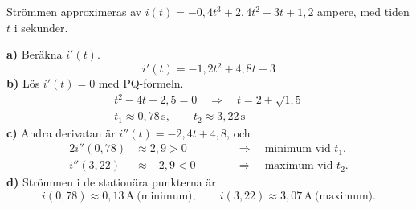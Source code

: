 \begin{exempel}
Strömmen approximeras av $i(t) = -0{,}4t^3 + 2{,}4t^2 - 3t + 1{,}2$ ampere, med tiden $t$ i
sekunder.
\par\noindent\textbf{a)} Beräkna $i'(t)$.
\[
  i'(t) = -1{,}2t^2 + 4{,}8t - 3
\]
\textbf{b)} Lös $i'(t) = 0$ med PQ-formeln.
\begin{gather*}
  t^2 - 4t + 2{,}5 = 0 \quad \Rightarrow \quad t = 2 \pm \sqrt{1{,}5} \\
  t_1 \approx 0{,}78\,\text{s}, \qquad t_2 \approx 3{,}22\,\text{s}
\end{gather*}
\textbf{c)} Andra derivatan är $i''(t) = -2{,}4t + 4{,}8$, och
\begin{alignat*}{2}
  i''(0{,}78) &\approx 2{,}9 > 0 &\qquad& \Rightarrow \quad \text{minimum vid } t_1, \\
  i''(3{,}22) &\approx -2{,}9 < 0 && \Rightarrow \quad \text{maximum vid } t_2.
\end{alignat*}
\textbf{d)} Strömmen i de stationära punkterna är
\[
  i(0{,}78) \approx 0{,}13\,\text{A} \ \text{(minimum)}, \qquad
  i(3{,}22) \approx 3{,}07\,\text{A} \ \text{(maximum)}.
\]
\end{exempel}
